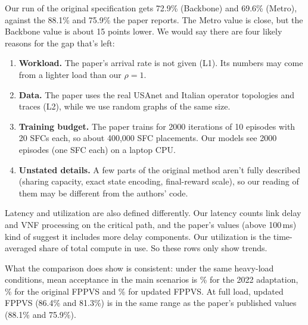Our run of the original specification gets 72.9\% (Backbone) and 69.6\%
(Metro), against the 88.1\% and 75.9\% the paper reports. The Metro value is
close, but the Backbone value is about 15 points lower. We would say there are
four likely reasons for the gap that's left:
\begin{enumerate}
  \item \textbf{Workload.} The paper's arrival rate is not given (L1). Its
  numbers may come from a lighter load than our $\rho=1$.
  \item \textbf{Data.} The paper uses the real USAnet and Italian operator
  topologies and traces (L2), while we use random graphs of the same size.
  \item \textbf{Training budget.} The paper trains for 2000 iterations of 10
  episodes with 20 SFCs each, so about 400{,}000 SFC placements. Our models see
  2000 episodes (one SFC each) on a laptop CPU.
  \item \textbf{Unstated details.} A few parts of the original method aren't
  fully described (sharing capacity, exact state encoding, final-reward scale),
  so our reading of them may be different from the authors' code.
\end{enumerate}
Latency and utilization are also defined differently. Our latency counts link
delay and VNF processing on the critical path, and the paper's values (above
100\,ms) kind of suggest it includes more delay components. Our utilization is
the time-averaged share of total compute in use. So these rows only show
trends.

What the comparison does show is consistent: under the same heavy-load
conditions, mean acceptance in the main scenarios is \zhangMeanAcc\% for the 2022
adaptation, \origMeanAcc\% for the original FPPVS and \fppvsMeanAcc\% for updated
FPPVS. At full load, updated FPPVS (86.4\% and 81.3\%) is in the same range as
the paper's published values (88.1\% and 75.9\%).
